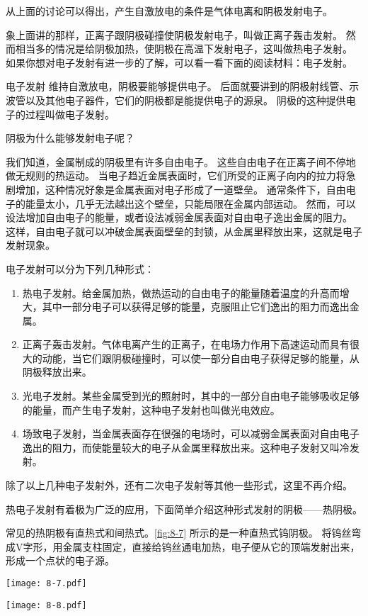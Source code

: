 从上面的讨论可以得出，产生自激放电的条件是气体电离和阴极发射电子。

象上面讲的那样，正离子跟阴极碰撞使阴极发射电子，叫做正离子轰击发射。
然而相当多的情况是给阴极加热，使阴极在高温下发射电子，这叫做热电子发射。
如果你想对电子发射有进一步的了解，可以看一看下面的阅读材料：电子发射。

\begin{Reading}{电子发射}
维持自激放电，阴极要能够提供电子。
后面就要讲到的阴极射线管、示波管以及其他电子器件，它们的阴极都是能提供电子的源泉。
阴极的这种提供电子的过程叫做电子发射。

阴极为什么能够发射电子呢？

我们知道，金属制成的阴极里有许多自由电子。
这些自由电子在正离子间不停地做无规则的热运动。
当电子趋近金属表面时，它们所受的正离子向内的拉力将急剧增加，这种情况好象是金属表面对电子形成了一道壁垒。
通常条件下，自由电子的能量太小，几乎无法越出这个壁垒，只能局限在金属内部运动。
然而，可以设法增加自由电子的能量，或者设法减弱金属表面对自由电子逸出金属的阻力。
这样，自由电子就可以冲破金属表面壁垒的封锁，从金属里释放出来，这就是电子发射现象。

电子发射可以分为下列几种形式：
\begin{enumerate}
  \item 热电子发射。给金属加热，做热运动的自由电子的能量随着温度的升高而增大，其中一部分电子可以获得足够的能量，克服阻止它们逸出的阻力而逸出金属。
  \item 正离子轰击发射。气体电离产生的正离子，在电场力作用下高速运动而具有很大的动能，当它们跟阴极碰撞时，可以使一部分自由电子获得足够的能量，从阴极释放出来。
  \item 光电子发射。某些金属受到光的照射时，其中的一部分自由电子能够吸收足够的能量，而产生电子发射，这种电子发射也叫做光电效应。
  \item 场致电子发射，当金属表面存在很强的电场时，可以减弱金属表面对自由电子逸出的阻力，而使能量较大的电子从金属里释放出来。这种电子发射又叫冷发射。
\end{enumerate}

除了以上几种电子发射外，还有二次电子发射等其他一些形式，这里不再介绍。

热电子发射有着极为广泛的应用，下面简单介绍这种形式发射的阴极——热阴极。

常见的热阴极有直热式和间热式。\cref{fig:8-7} 所示的是一种直热式钨阴极。
将钨丝弯成V字形，用金属支柱固定，直接给钨丝通电加热，电子便从它的顶端发射出来，形成一个点状的电子源。
\begin{figurehere}
  \begin{minipage}[b]{0.48\linewidth}\centering
    \texttt{[image: 8-7.pdf]}
    \caption{}\label{fig:8-7}
  \end{minipage}
  \begin{minipage}[b]{0.48\linewidth}\centering
    \texttt{[image: 8-8.pdf]}
    \caption{}\label{fig:8-8}
  \end{minipage}
\end{figurehere}


\end{Reading}
